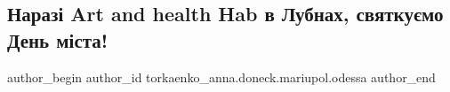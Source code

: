  
 
 
 
 

\subsection{Наразі Art and health Hab в Лубнах, святкуємо День міста!}
\label{sec:18_09_2022.fb.torkaenko_anna.doneck.mariupol.odessa.1.naraz__art_and_healt}

\ifcmt
 author_begin
   author_id torkaenko_anna.doneck.mariupol.odessa
 author_end
\fi
